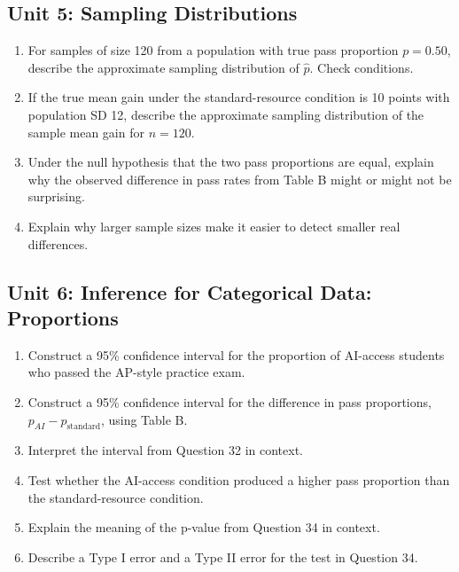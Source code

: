 \documentclass[11pt]{article}
\begin{document}
\subsection*{Unit 5: Sampling Distributions}
\begin{enumerate}[resume,leftmargin=*]
\item For samples of size 120 from a population with true pass
proportion $p = 0.50$, describe the approximate sampling
distribution of $\hat{p}$. Check conditions.
\item If the true mean gain under the standard-resource condition is
10 points with population SD 12, describe the approximate sampling
distribution of the sample mean gain for $n = 120$.
\item Under the null hypothesis that the two pass proportions are
equal, explain why the observed difference in pass rates from
Table B might or might not be surprising.
\item Explain why larger sample sizes make it easier to detect
smaller real differences.
\end{enumerate}

\subsection*{Unit 6: Inference for Categorical Data: Proportions}
\begin{enumerate}[resume,leftmargin=*]
\item Construct a 95\% confidence interval for the proportion of
AI-access students who passed the AP-style practice exam.
\item Construct a 95\% confidence interval for the difference in pass
proportions, $p_{AI} - p_{\text{standard}}$, using Table B.
\item Interpret the interval from Question 32 in context.
\item Test whether the AI-access condition produced a higher pass
proportion than the standard-resource condition.
\item Explain the meaning of the p-value from Question 34 in context.
\item Describe a Type I error and a Type II error for the test in
Question 34.
\end{enumerate}
\end{document}
